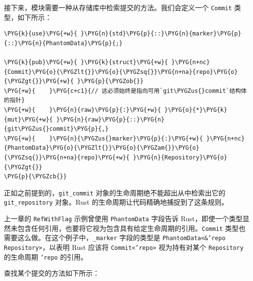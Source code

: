 接下来，模块需要一种从存储库中检索提交的方法。我们会定义一个 \texttt{Commit} 类型，如下所示：

\begin{Verbatim}[commandchars=\\\{\},breaklines=true,breakanywhere=true,fontsize=\codefont,xleftmargin=17bp]
\PYG{k}{use}\PYG{+w}{ }\PYG{n}{std}\PYG{p}{::}\PYG{n}{marker}\PYG{p}{::}\PYG{n}{PhantomData}\PYG{p}{;}

\PYG{k}{pub}\PYG{+w}{ }\PYG{k}{struct}\PYG{+w}{ }\PYG{n+nc}{Commit}\PYG{o}{\PYGZlt{}}\PYG{o}{\PYGZsq{}}\PYG{n+na}{repo}\PYG{o}{\PYGZgt{}}\PYG{+w}{ }\PYG{p}{\PYGZob{}}
\PYG{+w}{    }\PYG{c+c1}{// 这必须始终是指向可用`git\PYGZus{}commit`结构体的指针}
\PYG{+w}{    }\PYG{n}{raw}\PYG{p}{:}\PYG{+w}{ }\PYG{o}{*}\PYG{k}{mut}\PYG{+w}{ }\PYG{n}{raw}\PYG{p}{::}\PYG{n}{git\PYGZus{}commit}\PYG{p}{,}
\PYG{+w}{    }\PYG{n}{\PYGZus{}marker}\PYG{p}{:}\PYG{+w}{ }\PYG{n+nc}{PhantomData}\PYG{o}{\PYGZlt{}}\PYG{o}{\PYGZam{}}\PYG{o}{\PYGZsq{}}\PYG{n+na}{repo}\PYG{+w}{ }\PYG{n}{Repository}\PYG{o}{\PYGZgt{}}
\PYG{p}{\PYGZcb{}}
\end{Verbatim}

正如之前提到的，\texttt{git\_commit} 对象的生命周期绝不能超出从中检索出它的 \texttt{git\_repository} 对象。Rust 的生命周期让代码精确地捕捉到了这条规则。

上一章的 \texttt{RefWithFlag} 示例曾使用 \texttt{PhantomData} 字段告诉 Rust，即使一个类型显然未包含任何引用，也要将它视为包含具有给定生命周期的引用。\texttt{Commit} 类型也需要这么做。在这个例子中，\texttt{\_marker} 字段的类型是 \texttt{PhantomData<\&'repo Repository>}，以表明 Rust 应该将 \texttt{Commit<'repo>} 视为持有对某个 \texttt{Repository} 的生命周期 \texttt{'repo} 的引用。

查找某个提交的方法如下所示：

